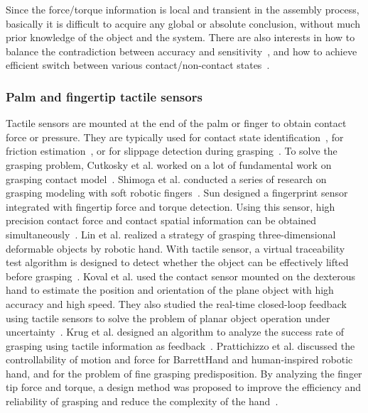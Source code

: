 \documentclass[journal,twoside,web]{ieeecolor}
\begin{document}
Since the force/torque information is local and transient in the assembly process, basically it is difficult to acquire any global or absolute conclusion, without much prior knowledge of the object and the system. 
There are also interests in how to balance the contradiction between accuracy and sensitivity~\cite{Sun2015,Miyashita2018}, and how to achieve efficient switch between various contact/non-contact states~\cite{Zhang2013,Gracia2018}.

\subsubsection{Palm and fingertip tactile sensors} 

Tactile sensors are mounted at the end of the palm or finger to obtain contact force or pressure. 
They are typically used for contact state identification~\cite{Chu2018,Pirozzi2018,Abdeetedal2018a}, for friction estimation~\cite{Howea,Cutkosky1986,Montano2018}, or for slippage detection during grasping~\cite{Schuermann2012,Wong2016,Rana2016,Motamedi2017,Veiga2018}.
To solve the grasping problem, Cutkosky et al. worked on a lot of fundamental work on grasping contact model~\cite{Cutkosky1986,Cutkosky1989,Cutkosky1989a,Howe1993}.
Shimoga et al. conducted a series of research on grasping modeling with soft robotic fingers~\cite{Shimogaa,Shimoga1996,Shimoga1996a}. 
Sun designed a fingerprint sensor integrated with fingertip force and torque detection. Using this sensor, high precision contact force and contact spatial information can be obtained simultaneously~\cite{Sun2011}.
Lin et al. realized a strategy of grasping three-dimensional deformable objects by robotic hand. 
With tactile sensor, a virtual traceability test algorithm is designed to detect whether the object can be effectively lifted before grasping~\cite{Lin2015a}. 
Koval et al. used the contact sensor mounted on the dexterous hand to estimate the position and orientation of the plane object with high accuracy and high speed. 
They also studied the real-time closed-loop feedback using tactile sensors to solve the problem of planar object operation under uncertainty~\cite{Koval2015}. 
Krug et al. designed an algorithm to analyze the success rate of grasping using tactile information as feedback~\cite{Krug2016}. 
Prattichizzo et al. discussed the controllability of motion and force for BarrettHand and human-inspired robotic hand, and for the problem of fine grasping predisposition. By analyzing the finger tip force and torque, a design method was proposed to improve the efficiency and reliability of grasping and reduce the complexity of the hand~\cite{Prattichizzo2013}.
\end{document}
